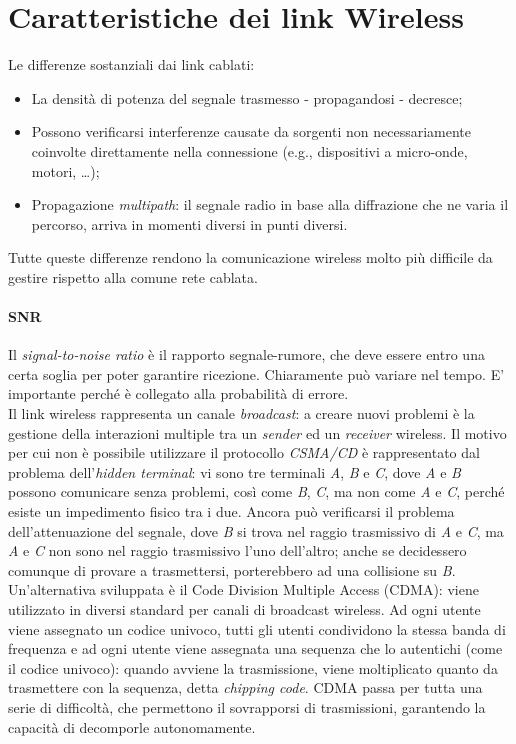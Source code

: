 \section{Caratteristiche dei link Wireless}
Le differenze sostanziali dai link cablati:
\begin{itemize}
	\item La densità di potenza del segnale trasmesso - propagandosi - decresce;
	\item Possono verificarsi interferenze causate da sorgenti non necessariamente coinvolte direttamente nella connessione (e.g., dispositivi a micro-onde, motori, \ldots);
	\item Propagazione \textit{multipath}: il segnale radio in base alla diffrazione che ne varia il percorso, arriva in momenti diversi in punti diversi.
\end{itemize}
Tutte queste differenze rendono la comunicazione wireless molto più difficile da gestire rispetto alla comune rete cablata.

\paragraph{SNR}
Il \textit{signal-to-noise ratio} è il rapporto segnale-rumore, che deve essere entro una certa soglia per poter garantire ricezione. Chiaramente può variare nel tempo. E' importante perché è collegato alla probabilità di errore. \\

Il link wireless rappresenta un canale \textit{broadcast}: a creare nuovi problemi è la gestione della interazioni multiple tra un \textit{sender} ed un \textit{receiver} wireless. Il motivo per cui non è possibile utilizzare il protocollo \textit{CSMA/CD} è rappresentato dal problema dell'\textit{hidden terminal}: vi sono tre terminali \textit{A}, \textit{B} e \textit{C}, dove \textit{A} e \textit{B} possono comunicare senza problemi, così come \textit{B}, \textit{C}, ma non come \textit{A} e \textit{C}, perché esiste un impedimento fisico tra i due. Ancora può verificarsi il problema dell'attenuazione del segnale, dove \textit{B} si trova nel raggio trasmissivo di \textit{A} e \textit{C}, ma \textit{A} e \textit{C} non sono nel raggio trasmissivo l'uno dell'altro; anche se decidessero comunque di provare a trasmettersi, porterebbero ad una collisione su \textit{B}. \\
Un'alternativa sviluppata è il Code Division Multiple Access (CDMA): viene utilizzato in diversi standard per canali di broadcast wireless. Ad ogni utente viene assegnato un codice univoco, tutti gli utenti condividono la stessa banda di frequenza e ad ogni utente viene assegnata una sequenza che lo autentichi (come il codice univoco): quando avviene la trasmissione, viene moltiplicato quanto da trasmettere con la sequenza, detta \textit{chipping code}. CDMA passa per tutta una serie di difficoltà, che permettono il sovrapporsi di trasmissioni, garantendo la capacità di decomporle autonomamente.

